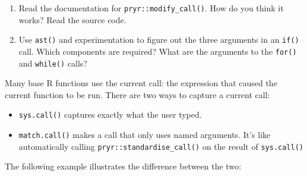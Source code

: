 \begin{enumerate}
\begin{Shaded}
\begin{Highlighting}[]
\NormalTok{(}\NormalTok{(}\NormalTok{(}\NormalTok{:}\NormalTok{, } \NormalTok{)))}
\NormalTok{(}\NormalTok{(}\NormalTok{(} \NormalTok{:}\NormalTok{)))}
\NormalTok{(}\NormalTok{(}\NormalTok{(} \NormalTok{:}\NormalTok{, , }\NormalTok{)))}
\end{Highlighting}
\end{Shaded}
\item
  Read the documentation for \texttt{pryr::modify\_call()}. How do you
  think it works? Read the source code.
\item
  Use \texttt{ast()} and experimentation to figure out the three
  arguments in an \texttt{if()} call. Which components are required?
  What are the arguments to the \texttt{for()} and \texttt{while()}
  calls?
\end{enumerate}


Many base R functions use the current call: the expression that caused
the current function to be run. There are two ways to capture a current
call: 

\begin{itemize}
\item
  \texttt{sys.call()} captures exactly what the user typed.
\item
  \texttt{match.call()} makes a call that only uses named arguments.
  It's like automatically calling \texttt{pryr::standardise\_call()} on
  the result of \texttt{sys.call()} 
\end{itemize}

The following example illustrates the difference between the two:

